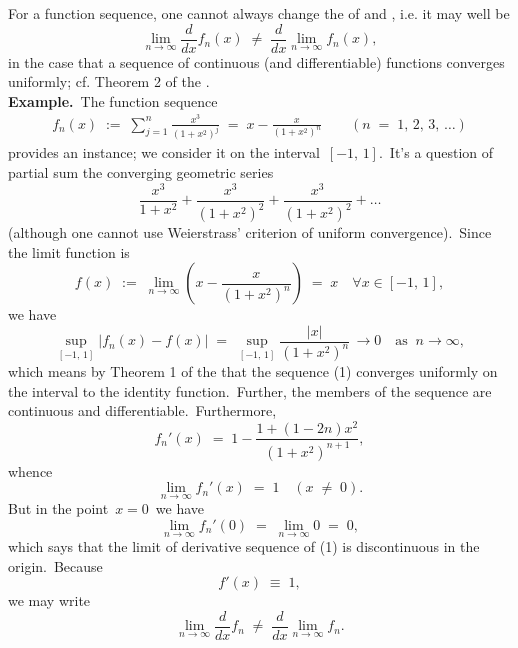 \documentclass[12pt]{article}
\theoremstyle{definition}
\begin{document}
For a function sequence, one cannot always change the  of  and , i.e. it may well be
$$\lim_{n\to\infty}\frac{d}{dx}f_n(x) \;\neq\; \frac{d}{dx}\lim_{n\to\infty}f_n(x),$$
 in the case that a sequence of continuous (and differentiable) functions converges uniformly; cf. Theorem 2 of the .\\

\textbf{Example.}\, The function sequence
\begin{align}
f_n(x) \;:=\; \sum_{j=1}^n\frac{x^3}{(1\!+\!x^2)^j} \;=\; x-\frac{x}{(1\!+\!x^2)^n} \qquad (n \;=\; 1,\,2,\,3,\,\ldots)
\end{align}
provides an instance; we consider it on the interval \,$[-1,\,1]$.\, It's a question of partial sum the converging geometric series
$$\frac{x^3}{1\!+\!x^2}+\frac{x^3}{(1\!+\!x^2)^2}+\frac{x^3}{(1\!+\!x^2)^2}+\ldots$$
(although one cannot use Weierstrass' criterion of uniform convergence).\, Since
the limit function is
$$f(x) \;:=\; \lim_{n\to\infty}\left(x-\frac{x}{(1\!+\!x^2)^n}\right) \;=\; x \quad \forall x \in [-1,\,1],$$
we have
$$\sup_{[-1,\,1]}|f_n(x)-f(x)| \;=\; \sup_{[-1,\,1]}\frac{|x|}{(1\!+\!x^2)^n} 
\,\longrightarrow 0 \quad \mbox{as}\;\; n \to \infty,$$
which means by Theorem 1 of the  that the sequence (1) converges uniformly on the interval to the identity function.\, Further, the members of the sequence are continuous and differentiable.\, Furthermore,
$$f_n'(x) \;=\; 1-\frac{1\!+(1\!-\!2n)x^2}{(1\!+\!x^2)^{n+1}},$$
whence 
$$\lim_{n\to\infty}f_n'(x) \;=\; 1 \quad (x \;\neq\; 0).$$
But in the point \,$x = 0$\, we have
$$\lim_{n\to\infty}f_n'(0) \;=\; \lim_{n\to\infty}0 \;=\; 0,$$ 
which says that the limit of derivative sequence of (1) is discontinuous in the origin.\, Because
$$f'(x) \;\equiv\; 1,$$
we may write
$$\lim_{n\to\infty}\frac{d}{dx}f_n \;\neq\; \frac{d}{dx}\lim_{n\to\infty}f_n.$$

\end{document}
